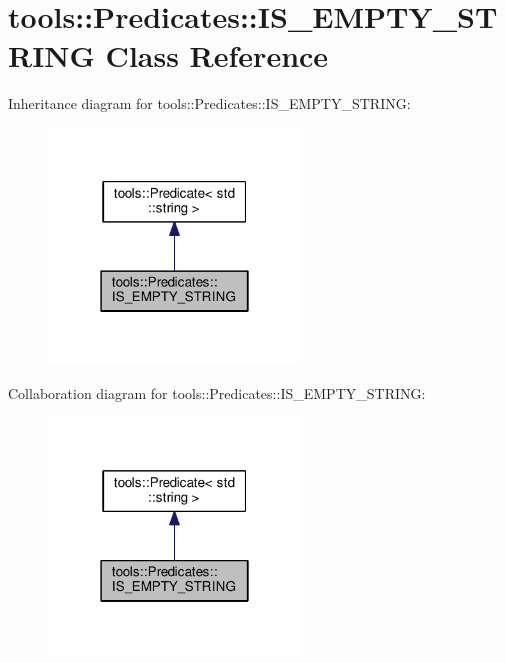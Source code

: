 \hypertarget{classtools_1_1Predicates_1_1IS__EMPTY__STRING}{}\section{tools\+:\+:Predicates\+:\+:I\+S\+\_\+\+E\+M\+P\+T\+Y\+\_\+\+S\+T\+R\+I\+NG Class Reference}
\label{classtools_1_1Predicates_1_1IS__EMPTY__STRING}


Inheritance diagram for tools\+:\+:Predicates\+:\+:I\+S\+\_\+\+E\+M\+P\+T\+Y\+\_\+\+S\+T\+R\+I\+NG\+:
\nopagebreak
\begin{figure}[H]
\begin{center}
\leavevmode
\includegraphics[width=190pt]{classtools_1_1Predicates_1_1IS__EMPTY__STRING__inherit__graph}
\end{center}
\end{figure}


Collaboration diagram for tools\+:\+:Predicates\+:\+:I\+S\+\_\+\+E\+M\+P\+T\+Y\+\_\+\+S\+T\+R\+I\+NG\+:
\nopagebreak
\begin{figure}[H]
\begin{center}
\leavevmode
\includegraphics[width=190pt]{classtools_1_1Predicates_1_1IS__EMPTY__STRING__coll__graph}
\end{center}
\end{figure}
